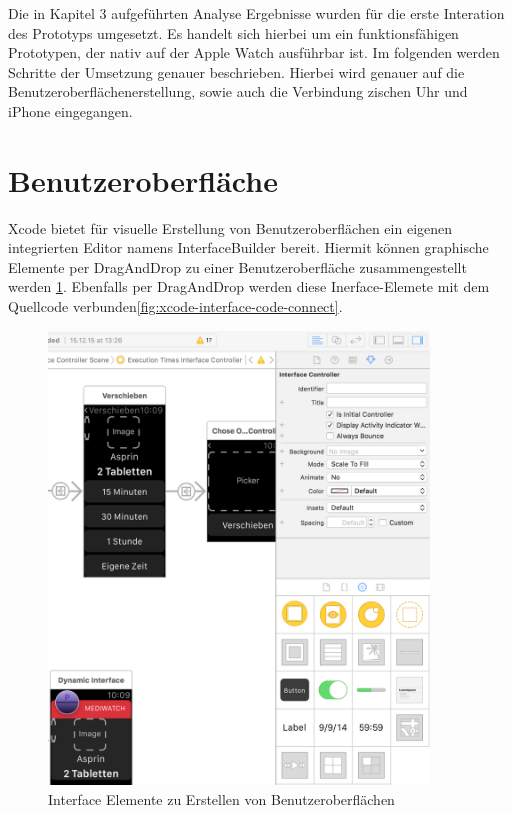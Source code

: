 
Die in Kapitel 3 aufgeführten Analyse Ergebnisse wurden für die erste Interation des Prototyps umgesetzt. Es handelt sich hierbei um ein funktionsfähigen Prototypen, der nativ auf der Apple Watch ausführbar ist. Im folgenden werden Schritte der Umsetzung genauer beschrieben. Hierbei wird genauer auf die Benutzeroberflächenerstellung, sowie auch die Verbindung zischen Uhr und iPhone eingegangen.

\section{Benutzeroberfläche}
Xcode bietet für visuelle Erstellung von Benutzeroberflächen ein eigenen integrierten Editor namens InterfaceBuilder bereit. Hiermit können graphische Elemente per DragAndDrop zu einer Benutzeroberfläche zusammengestellt werden \ref{fig:xcode-interface-elements}. Ebenfalls per DragAndDrop werden diese Inerface-Elemete mit dem Quellcode verbunden\ref{fig:xcode-interface-code-connect}.
\begin{figure}
	\caption{Interface Elemente zu Erstellen von Benutzeroberflächen}
	\label{fig:xcode-interface-elements}
	\centering
		\includegraphics[width=0.9\textwidth]{04_realisation/screenshots/xcode-interface-elements}
\end{figure}

